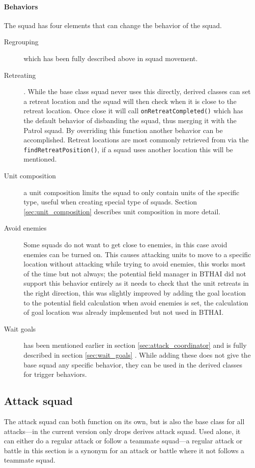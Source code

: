 \paragraph{Behaviors}
The squad has four elements that can change the behavior of the squad.
\begin{description}
	\item[Regrouping] which has been fully described above in squad movement.
	\item[Retreating]. While the base class squad never uses this directly, derived classes can set a retreat location and the squad will then check when it is close to the retreat location. Once close it will call \texttt{onRetreatCompleted()} which has the default behavior of disbanding the squad, thus merging it with the Patrol squad. By overriding this function another behavior can be accomplished. Retreat locations are most commonly retrieved from  via the \texttt{findRetreatPosition()}, if a squad uses another location this will be mentioned.
	\item[Unit composition] a unit composition limits the squad to only contain units of the specific type, useful when creating special type of squads. Section \ref{sec:unit_composition} describes unit composition in more detail.
	\item[Avoid enemies] Some squads do not want to get close to enemies, in this case avoid enemies can be turned on. This causes attacking units to move to a specific location without attacking while trying to avoid enemies, this works most of the time but not always; the potential field manager in BTHAI did not support this behavior entirely as it needs to check that the unit retreats in the right direction, this was slightly improved by adding the goal location to the potential field calculation when avoid enemies is set, the calculation of goal location was already implemented but not used in BTHAI.
	\item[Wait goals] has been mentioned earlier in section \ref{sec:attack_coordinator}  and is fully described in section \ref{sec:wait_goals} . While adding these does not give the base squad any specific behavior, they can be used in the derived classes for trigger behaviors.
\end{description}

\subsection{Attack squad}
\label{sec:attack_squad} The attack squad can both function on its own, but is also the base class
for all attacks—in the current version only drops derives attack squad. Used alone, it can either do
a regular attack or follow a teammate squad—a regular attack or battle in this section is a synonym
for an attack or battle where it not follows a teammate squad.

